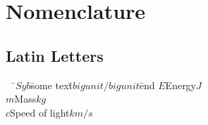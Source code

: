 \chapter*{Nomenclature}

\section*{Latin Letters}
\begin{tabbing}
$\quad$\=$Syb$\hspace{2.45cm}\=some text\hspace{7.5cm}\=$big unit/big unit$\=end\kill
\>$E$\>Energy\>$J$\\
\>$m$\>Mass\>$kg$\\
\>$c$\>Speed of light\>$km/s$\\
\end{tabbing}


